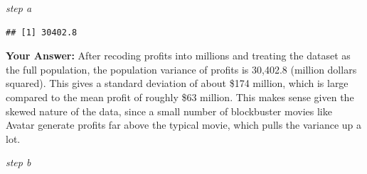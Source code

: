 \documentclass[
]{article}
\newenvironment{Shaded}{\begin{snugshade}}{\end{snugshade}}
\newcommand{\AttributeTok}[1]{\textcolor[rgb]{0.13,0.29,0.53}{#1}}
\newcommand{\ConstantTok}[1]{\textcolor[rgb]{0.56,0.35,0.01}{#1}}
\newcommand{\DecValTok}[1]{\textcolor[rgb]{0.00,0.00,0.81}{#1}}
\newcommand{\FloatTok}[1]{\textcolor[rgb]{0.00,0.00,0.81}{#1}}
\newcommand{\FunctionTok}[1]{\textcolor[rgb]{0.13,0.29,0.53}{\textbf{#1}}}
\newcommand{\NormalTok}[1]{#1}
\newcommand{\OtherTok}[1]{\textcolor[rgb]{0.56,0.35,0.01}{#1}}
\newcommand{\SpecialCharTok}[1]{\textcolor[rgb]{0.81,0.36,0.00}{\textbf{#1}}}
\begin{document}
\emph{step a}

\begin{Shaded}
\end{Shaded}

\begin{verbatim}
## [1] 30402.8
\end{verbatim}

\textbf{Your Answer:} After recoding profits into millions and treating
the dataset as the full population, the population variance of profits
is 30,402.8 (million dollars squared). This gives a standard deviation
of about \$174 million, which is large compared to the mean profit of
roughly \$63 million. This makes sense given the skewed nature of the
data, since a small number of blockbuster movies like Avatar generate
profits far above the typical movie, which pulls the variance up a lot.

\emph{step b}

\begin{Shaded}
\end{Shaded}
\end{document}
